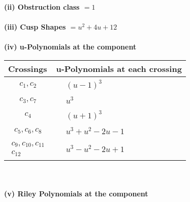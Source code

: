 \documentclass[1p]{elsarticle_modified}
\theoremstyle{definition}
\begin{document}
\flushleft \textbf{(ii) Obstruction class $= 1$}\\~\\
\flushleft \textbf{(iii) Cusp Shapes $= u^2+4 u+12$}\\~\\
\newpage\renewcommand{\arraystretch}{1}
\flushleft \textbf{(iv) u-Polynomials at the component}\newline \\
\begin{tabular}{m{50pt}|m{274pt}}
Crossings & \hspace{64pt}u-Polynomials at each crossing \\
\hline $$\begin{aligned}c_{1},c_{2}\end{aligned}$$&$\begin{aligned}
&(u-1)^3
\end{aligned}$\\
\hline $$\begin{aligned}c_{3},c_{7}\end{aligned}$$&$\begin{aligned}
&u^3
\end{aligned}$\\
\hline $$\begin{aligned}c_{4}\end{aligned}$$&$\begin{aligned}
&(u+1)^3
\end{aligned}$\\
\hline $$\begin{aligned}c_{5},c_{6},c_{8}\end{aligned}$$&$\begin{aligned}
&u^3+u^2-2 u-1
\end{aligned}$\\
\hline $$\begin{aligned}c_{9},c_{10},c_{11}\\c_{12}\end{aligned}$$&$\begin{aligned}
&u^3- u^2-2 u+1
\end{aligned}$\\
\hline
\end{tabular}\\~\\
\newpage\renewcommand{\arraystretch}{1}
\flushleft \textbf{(v) Riley Polynomials at the component}\newline \\
\end{document}
